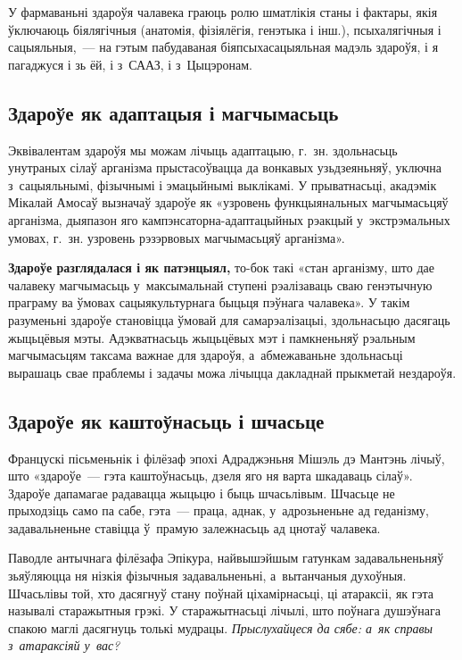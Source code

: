 У фармаваньні здароўя чалавека граюць ролю шматлікія станы і фактары, якія ўключаюць біялягічныя (анатомія, фізіялёгія, генэтыка і інш.), псыхалягічныя і сацыяльныя,~--- на гэтым пабудаваная біяпсыхасацыяльная мадэль здароўя, і я пагаджуся і зь ёй, і з~СААЗ, і з~Цыцэронам.


\subsection*{Здароўе як адаптацыя і магчымасьць}

Эквівалентам здароўя мы можам лічыць адаптацыю, г.~зн. здольнасьць унутраных сілаў арганізма прыстасоўвацца да вонкавых узьдзеяньняў, уключна з~сацыяльнымі, фізычнымі і эмацыйнымі выклікамі. У прыватнасьці, акадэмік Мікалай Амосаў вызначаў здароўе як «узровень функцыянальных магчымасьцяў арганізма, дыяпазон яго кампэнсаторна-адаптацыйных рэакцый у~экстрэмальных умовах, г.~зн. узровень рэзэрвовых магчымасьцяў арганізма».

\textbf{Здароўе разглядалася і як патэнцыял,} то-бок такі «стан арганізму, што дае чалавеку магчымасьць у~максымальнай ступені рэалізаваць сваю генэтычную праграму ва ўмовах сацыякультурнага быцьця пэўнага чалавека». У такім разуменьні здароўе становіцца ўмовай для самарэалізацыі, здольнасьцю дасягаць жыцьцёвыя мэты. Адэкватнасьць жыцьцёвых мэт і памкненьняў рэальным магчымасьцям таксама важнае для здароўя, а~абмежаваньне здольнасьці вырашаць свае праблемы і задачы можа лічыцца дакладнай прыкметай нездароўя.

\subsection*{Здароўе як каштоўнасьць і шчасьце}

Францускі пісьменьнік і філёзаф эпохі Адраджэньня Мішэль дэ Мантэнь лічыў, што «здароўе~--- гэта каштоўнасьць, дзеля яго ня варта шкадаваць сілаў». Здароўе дапамагае радавацца жыцьцю і быць шчасьлівым. Шчасьце не прыходзіць само па сабе, гэта~--- праца, аднак, у~адрозьненьне ад геданізму, задавальненьне ставіцца ў~прамую залежнасьць ад цнотаў чалавека.

Паводле антычнага філёзафа Эпікура, найвышэйшым гатункам задавальненьняў зьяўляюцца ня нізкія фізычныя задавальненьні, а~вытанчаныя духоўныя. Шчасьлівы той, хто дасягнуў стану поўнай ціхамірнасьці, ці атараксіі, як гэта называлі старажытныя грэкі. У старажытнасьці лічылі, што поўнага душэўнага спакою маглі дасягнуць толькі мудрацы. \emph{Прыслухайцеся да сябе: а~як справы з~атараксіяй у~вас?}

